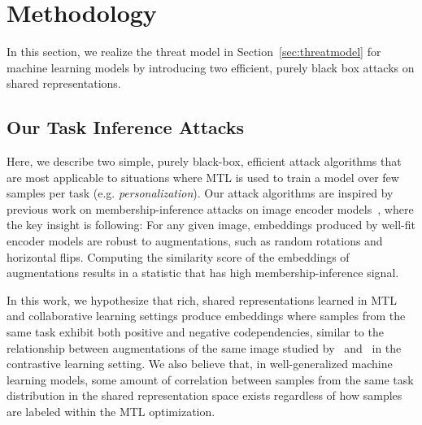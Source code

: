 \section{Methodology} \label{sec:methodology}

In this section, we realize the threat model in Section~\ref{sec:threatmodel} for machine learning models by introducing two efficient, purely black box attacks on shared representations. 


\subsection{Our Task Inference Attacks}

Here, we describe two simple, purely black-box, efficient attack algorithms that are most applicable to situations where MTL is used to train a model over few samples per task (e.g. \textit{personalization}). Our attack algorithms are inspired by previous work on membership-inference attacks on image encoder models~\cite{liu2021encodermi}, where the key insight is following: For any given image, embeddings produced by well-fit encoder models are robust to augmentations, such as random rotations and horizontal flips. Computing the similarity score of the embeddings of augmentations results in a statistic that has high membership-inference signal. %

In this work, we hypothesize that rich, shared representations learned in MTL and collaborative learning settings produce embeddings where samples from the same task exhibit both positive and negative codependencies, similar to the relationship between augmentations of the same image studied by~\cite{liu2021encodermi} and~\cite{song-2020-embeddingleakage} in the contrastive learning setting. We also believe that, in well-generalized machine learning models, some amount of correlation between samples from the same task distribution in the shared representation space exists regardless of how samples are labeled within the MTL optimization. 
% 


